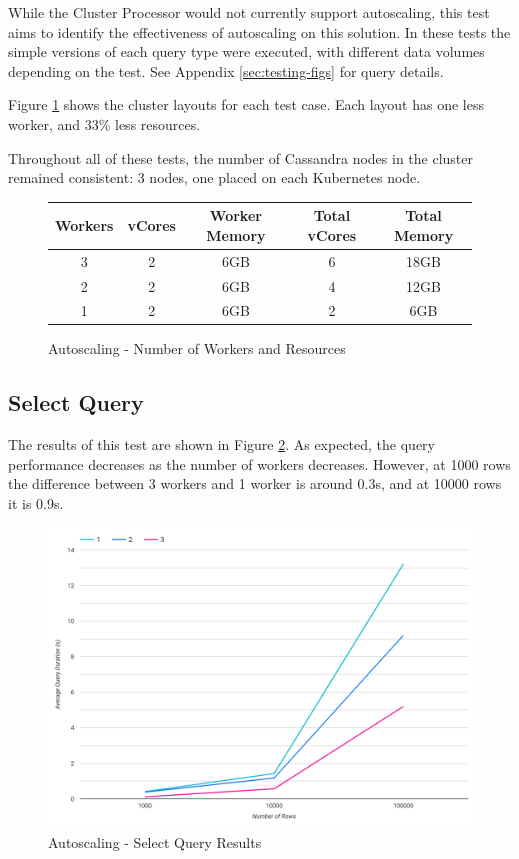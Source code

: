 While the Cluster Processor would not currently support autoscaling, this test aims to identify the effectiveness of autoscaling on this solution. In these tests the simple versions of each query type were executed, with different data volumes depending on the test. See Appendix \ref{sec:testing-figs} for query details. 

Figure \ref{fig:autoscale-test-workers} shows the cluster layouts for each test case. Each layout has one less worker, and 33\% less resources.

Throughout all of these tests, the number of Cassandra nodes in the cluster remained consistent: 3 nodes, one placed on each Kubernetes node.

\begin{figure}[ht]
	\centering
	\begin{tabular}{| c | c | c | c | c |}
		\hline
		\textbf{Workers} & \textbf{vCores} & \textbf{Worker Memory} & \textbf{Total vCores} & \textbf{Total Memory} \\ \hline
		3 & 2 & 6GB & 6 & 18GB \\ \hline
		2 & 2 & 6GB & 4 & 12GB \\ \hline
		1 & 2 & 6GB & 2 & 6GB \\ \hline
	\end{tabular}
	\caption{Autoscaling - Number of Workers and Resources}
	\label{fig:autoscale-test-workers}
\end{figure}

\subsection{Select Query}
The results of this test are shown in Figure \ref{fig:select-simple-autoscale-test}. As expected, the query performance decreases as the number of workers decreases. However, at 1000 rows the difference between 3 workers and 1 worker is around 0.3s, and at 10000 rows it is 0.9s.

\begin{figure}[ht]
	\centering
	\includegraphics[width=0.8\linewidth]{chapters/diagrams/testing/select-simple-autoscale-test}
	\caption{Autoscaling - Select Query Results}
	\label{fig:select-simple-autoscale-test}
\end{figure}

